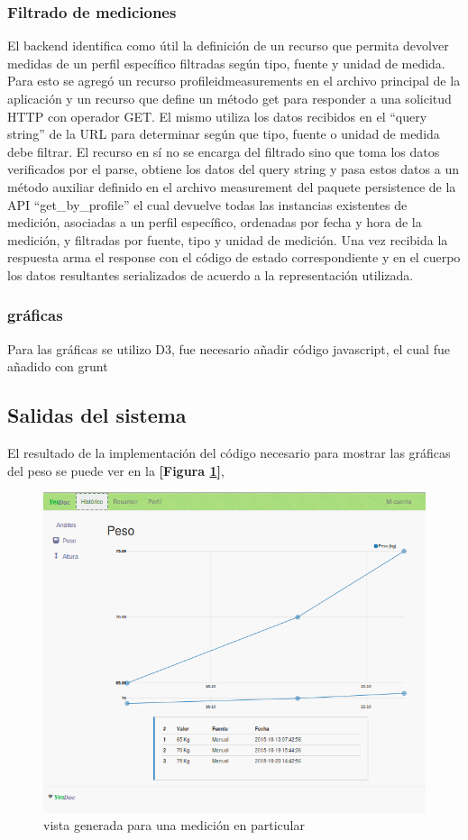 \documentclass[a4paper,12pt]{article}
\begin{document}
\subsubsection{Filtrado de mediciones}
El backend identifica como útil la definición de un recurso que permita devolver medidas de un perfil específico filtradas según tipo, fuente y unidad de medida. Para esto se agregó un recurso \/profile\/id\/measurements en el archivo principal de la aplicación y un recurso que define un método get para responder a una solicitud HTTP con operador GET. El mismo utiliza los datos recibidos en el ``query string'' de la URL para determinar según que tipo, fuente o unidad de medida debe filtrar. El recurso en sí no se encarga del filtrado sino que toma los datos verificados por el parse, obtiene los datos del query string y pasa estos datos a un método auxiliar definido en el archivo measurement del paquete persistence de la API ``get\_by\_profile'' el cual devuelve todas las instancias existentes de medición, asociadas a un perfil específico, ordenadas por fecha y hora de la medición, y filtradas por fuente, tipo y unidad de medición. Una vez recibida la respuesta arma el response con el código de estado correspondiente y en el cuerpo los datos resultantes serializados de acuerdo a la representación utilizada.



\subsubsection{gráficas}
Para las gráficas se utilizo D3, fue necesario añadir código javascript, el cual fue añadido con grunt
\subsection{Salidas del sistema}
El resultado de la implementación del código necesario para mostrar las gráficas del peso se puede ver en la \textbf{[Figura \ref{5-grafica_medicion}]}, 


\begin{figure}[h!]
  \centering
  \includegraphics[width=.8\textwidth]{img/5-grafica_medicion}
  \caption{vista generada para una medición en particular}
  \label{5-grafica_medicion}
\end{figure}
\end{document}
